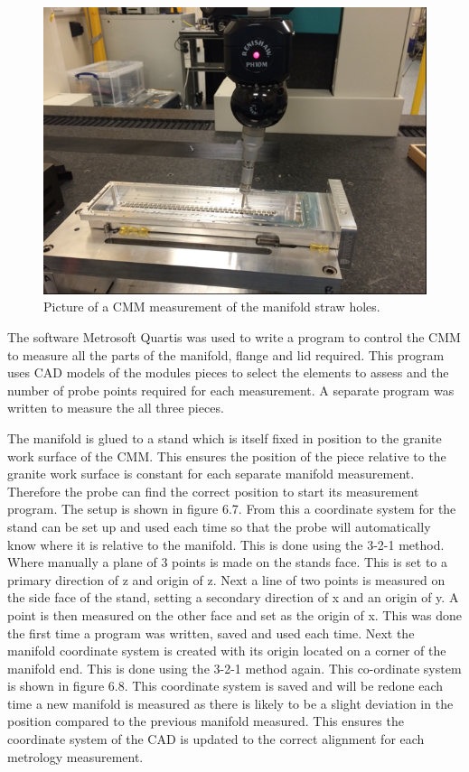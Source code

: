 \begin{figure}[th]
\centering
\includegraphics[scale=1.3]{Figures/cmm1}
\decoRule
\caption{Picture of a CMM measurement of the manifold straw holes.}
\label{fig:cmm1}
\end{figure}

The software Metrosoft Quartis \cite{metrosoft} was used to write a program to control the CMM to measure all the parts of the manifold, flange and lid required. This program uses CAD models of the modules pieces to select the elements to assess and the number of probe points required for each measurement. A separate program was written to measure the all three pieces.

The manifold is glued to a stand which is itself fixed in position to the granite work surface of the CMM. This ensures the position of the piece relative to the granite work surface is constant for each separate manifold measurement. Therefore the probe can find the correct position to start its measurement program. The setup is shown in figure 6.7. From this a coordinate system for the stand can be set up and used each time so that the probe will automatically know where it is relative to the manifold. This is done using the 3-2-1 method. Where manually a plane of 3 points is made on the stands face. This is set to a primary direction of z and origin of z. Next a line of two points is measured on the side face of the stand, setting a secondary direction of x and an origin of y. A point is then measured on the other face and set as the origin of x. This was done the first time a program was written, saved and used each time. Next the manifold coordinate system is created with its origin located on a corner of the manifold end. This is done using the 3-2-1 method again. This co-ordinate system is shown in figure 6.8. This coordinate system is saved and will be redone each time a new manifold is measured as there is likely to be a slight deviation in the position compared to the previous manifold measured. This ensures the coordinate system of the CAD is updated to the correct alignment for each metrology measurement. 

